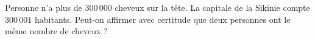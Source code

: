 Personne n'a plus de $300\,000$ cheveux sur la tête. La capitale de la Sikinie compte $300\,001$ habitants. Peut-on affirmer avec certitude que deux personnes ont le même nombre de cheveux ?
